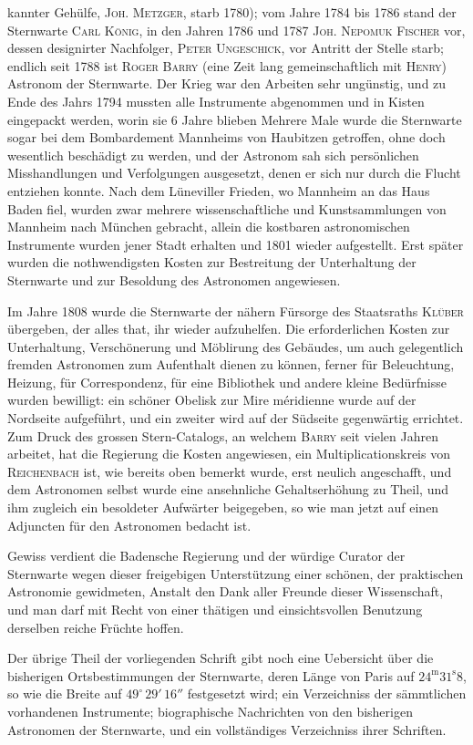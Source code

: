 \noindent kannter Gehülfe, \textsc{Joh. Metzger}, starb 1780); vom Jahre 1784 bis 1786 stand der Sternwarte \textsc{Carl König}, in den Jahren 1786 und 1787 \textsc{Joh. Nepomuk Fischer} vor, dessen designirter Nachfolger, \textsc{Peter Ungeschick}, vor Antritt der Stelle starb; endlich seit 1788 ist \textsc{Roger Barry} (eine Zeit lang gemeinschaftlich mit \textsc{Henry}) Astronom der Sternwarte. Der Krieg war den Arbeiten sehr ungünstig, und zu Ende des Jahrs 1794 mussten alle Instrumente abgenommen und in Kisten eingepackt werden, worin sie 6 Jahre blieben Mehrere Male wurde die Sternwarte sogar bei dem Bombardement Mannheims von Haubitzen getroffen, ohne doch wesentlich beschädigt zu werden, und der Astronom sah sich persönlichen Misshandlungen und Verfolgungen ausgesetzt, denen er sich nur durch die Flucht entziehen konnte. Nach dem Lüneviller Frieden, wo Mannheim an das Haus Baden fiel, wurden zwar mehrere wissenschaftliche und Kunstsammlungen von Mannheim nach München gebracht, allein die kostbaren astronomischen Instrumente wurden jener Stadt erhalten und 1801 wieder aufgestellt. Erst später wurden die nothwendigsten Kosten zur Bestreitung der Unterhaltung der Sternwarte und zur Besoldung des Astronomen angewiesen.

Im Jahre 1808 wurde die Sternwarte der nähern Fürsorge des Staatsraths \textsc{Klüber} übergeben, der alles that, ihr wieder aufzuhelfen. Die erforderlichen Kosten zur Unterhaltung, Verschönerung und Möblirung des Gebäudes, um auch gelegentlich fremden Astronomen zum Aufenthalt dienen zu können, ferner für Beleuchtung, Heizung, für Correspondenz, für eine Bibliothek und andere kleine Bedürfnisse wurden bewilligt: ein schöner Obelisk zur Mire méridienne wurde auf der Nordseite aufgeführt, und ein zweiter wird auf der Südseite gegenwärtig errichtet. Zum Druck des grossen Stern-Catalogs, an welchem \textsc{Barry} seit vielen Jahren arbeitet, hat die Regierung die Kosten angewiesen, ein Multiplicationskreis von \textsc{Reichenbach} ist, wie bereits oben bemerkt wurde, erst neulich angeschafft, und dem Astronomen selbst wurde eine ansehnliche Gehaltserhöhung zu Theil, und ihm zugleich ein besoldeter Aufwärter beigegeben, so wie man jetzt auf einen Adjuncten für den Astronomen bedacht ist.

Gewiss verdient die Badensche Regierung und der würdige Curator der Sternwarte wegen dieser freigebigen Unterstützung einer schönen, der praktischen Astronomie gewidmeten, Anstalt den Dank aller Freunde dieser Wissenschaft, und man darf mit Recht von einer thätigen und einsichtsvollen Benutzung derselben reiche Früchte hoffen.

Der übrige Theil der vorliegenden Schrift gibt noch eine Uebersicht über die bisherigen Ortsbestimmungen der Sternwarte, deren Länge von Paris auf $24^{\mathrm m}31^{\mathrm s}8$, so wie die Breite auf $49^\circ\,29'\,16''$ festgesetzt wird; ein Verzeichniss der sämmtlichen vorhandenen Instrumente; biographische Nachrichten von den bisherigen Astronomen der Sternwarte, und ein vollständiges Verzeichniss ihrer Schriften.
